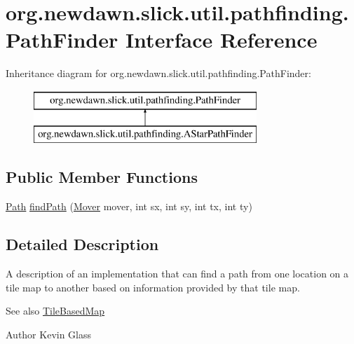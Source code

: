 \hypertarget{interfaceorg_1_1newdawn_1_1slick_1_1util_1_1pathfinding_1_1_path_finder}{}\section{org.\+newdawn.\+slick.\+util.\+pathfinding.\+Path\+Finder Interface Reference}
\label{interfaceorg_1_1newdawn_1_1slick_1_1util_1_1pathfinding_1_1_path_finder}
Inheritance diagram for org.\+newdawn.\+slick.\+util.\+pathfinding.\+Path\+Finder\+:\begin{figure}[H]
\begin{center}
\leavevmode
\includegraphics[height=2.000000cm]{interfaceorg_1_1newdawn_1_1slick_1_1util_1_1pathfinding_1_1_path_finder}
\end{center}
\end{figure}
\subsection*{Public Member Functions}
\begin{DoxyCompactItemize}
\item 
\mbox{\hyperlink{classorg_1_1newdawn_1_1slick_1_1util_1_1pathfinding_1_1_path}{Path}} \mbox{\hyperlink{interfaceorg_1_1newdawn_1_1slick_1_1util_1_1pathfinding_1_1_path_finder_a74ba20251bc78c37f91821c71a97a58d}{find\+Path}} (\mbox{\hyperlink{interfaceorg_1_1newdawn_1_1slick_1_1util_1_1pathfinding_1_1_mover}{Mover}} mover, int sx, int sy, int tx, int ty)
\end{DoxyCompactItemize}


\subsection{Detailed Description}
A description of an implementation that can find a path from one location on a tile map to another based on information provided by that tile map.

\begin{DoxySeeAlso}{See also}
\mbox{\hyperlink{interfaceorg_1_1newdawn_1_1slick_1_1util_1_1pathfinding_1_1_tile_based_map}{Tile\+Based\+Map}} 
\end{DoxySeeAlso}
\begin{DoxyAuthor}{Author}
Kevin Glass 
\end{DoxyAuthor}


